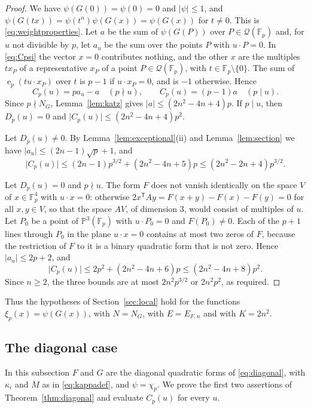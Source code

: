 \documentclass[11pt]{amsart}
\numberwithin{equation}{section}
\numberwithin{figure}{section}
\theoremstyle{definition}
\newcommand{\e}{\operatorname{e}}
\newcommand{\abs}[1]{\lvert #1\rvert}
\newcommand{\Fp}{\mathbb F_p}
\newcommand{\PP}{\mathbb P}
\newcommand{\Qc}{\mathcal Q}
\begin{document}
\begin{proof}
We have $\psi(G(0))=\psi(0)=0$ and $\abs{\psi}\le1$, and
$\psi(G(tx))=\psi(t^n)\psi(G(x))=\psi(G(x))$ for $t\ne0$. This is
\eqref{eq:weightproperties}. Let $a$ be the sum of $\psi(G(P))$ over
$P\in\Qc(\Fp)$ and, for $u$ not divisible by $p$, let $a_u$ be the
sum over the points $P$ with $u\cdot P=0$. In \eqref{eq:Cpsi} the
vector $x=0$ contributes nothing, and the other $x$ are the multiples
$tx_P$ of a representative $x_P$ of a point $P\in\Qc(\Fp)$, with
$t\in\Fp\setminus\{0\}$. The sum of $\e_p(tu\cdot x_P)$ over $t$ is
$p-1$ if $u\cdot x_P=0$, and is $-1$ otherwise. Hence
\begin{equation}\label{eq:rays}
 C_p(u)=pa_u-a\quad(p\nmid u),\qquad C_p(u)=(p-1)a\quad(p\mid u).
\end{equation}
Since $p\nmid N_G$, Lemma~\ref{lem:katz} gives
$\abs a\le(2n^2-4n+4)p$. If $p\mid u$, then $D_p(u)=0$ and
$\abs{C_p(u)}\le(2n^2-4n+4)p^2$.

Let $D_p(u)\ne0$. By Lemma~\ref{lem:exceptional}(ii) and
Lemma~\ref{lem:section} we have $\abs{a_u}\le(2n-1)\sqrt p+1$, and
\[
 \abs{C_p(u)}\le(2n-1)p^{3/2}+(2n^2-4n+5)p\le(2n^2-2n+4)p^{3/2}.
\]

Let $D_p(u)=0$ and $p\nmid u$. The form $F$ does not vanish
identically on the space $V$ of $x\in\Fp^4$ with $u\cdot x=0$:
otherwise $2x^{\mathsf T}Ay=F(x+y)-F(x)-F(y)=0$ for all $x,y\in V$,
so that the space
$AV$, of dimension $3$, would consist of multiples of $u$. Let $P_0$
be a point of $\PP^3(\Fp)$ with $u\cdot P_0=0$ and $F(P_0)\ne0$. Each
of the $p+1$ lines through $P_0$ in the plane $u\cdot x=0$ contains
at most two zeros of $F$, because the restriction of $F$ to it is a
binary quadratic form that is not zero. Hence
$\abs{a_u}\le2p+2$, and
\[
 \abs{C_p(u)}\le2p^2+(2n^2-4n+6)p\le(2n^2-4n+8)p^2.
\]
Since $n\ge2$, the three bounds are at most $2n^2p^{3/2}$ or
$2n^2p^2$, as required.
\end{proof}

Thus the hypotheses of Section~\ref{sec:local} hold for the functions
$\xi_p(x)=\psi(G(x))$, with $N=N_G$, with $E=E_{F,n}$ and with
$K=2n^2$.

\subsection{The diagonal case}\label{sec:diagonal}

In this subsection $F$ and $G$ are the diagonal quadratic forms of
\eqref{eq:diagonal}, with $\kappa_i$ and $M$ as in
\eqref{eq:kappadef}, and $\psi=\chi_p$. We prove the first two
assertions of Theorem~\ref{thm:diagonal} and evaluate $C_p(u)$ for
every $u$.
\end{document}
